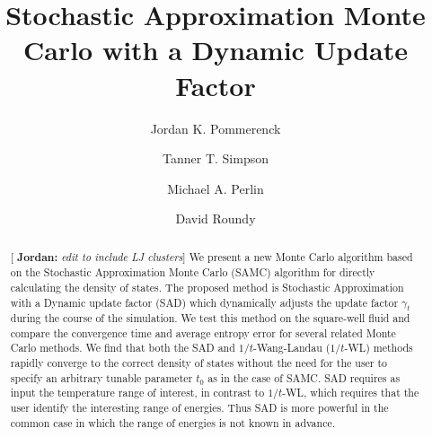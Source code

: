 \documentclass[letterpaper,twocolumn,amsmath,amssymb,pre,aps,10pt]{revtex4-1}
\newcommand{\blue}[1]{{\bf \color{blue} #1}}
\newcommand{\jpsays}[1]{{\color{red} [\blue{Jordan:} \emph{#1}]}}
\begin{document}
\title{Stochastic Approximation Monte Carlo with a Dynamic Update
Factor
}

\author{Jordan K. Pommerenck} \author{Tanner T. Simpson}
\author{Michael A. Perlin} \author{David Roundy}

\begin{abstract}
  \jpsays{edit to include LJ clusters}
  We present a new Monte Carlo algorithm based on the Stochastic
  Approximation Monte Carlo (SAMC) algorithm for directly calculating
  the density of states. The proposed method is Stochastic
  Approximation with a Dynamic update factor (SAD)
  which dynamically adjusts the update factor $\gamma_t$ during the course of
  the simulation. We test this method on the square-well fluid and
  compare the convergence time and average entropy error for several
  related
  Monte Carlo methods. We find that both the SAD and $1/t$-Wang-Landau ($1/t$-WL)
  methods rapidly converge to the
  correct density of states without the need for the user to specify an
  arbitrary tunable parameter $t_0$ as in the case of SAMC.  SAD requires
  as input the temperature range of interest, in contrast to
  $1/t$-WL, which requires that the user identify the interesting range
  of energies.  Thus SAD is more powerful in the common case in which the range
  of energies is not known in advance.
\end{abstract}

\maketitle
\end{document}
